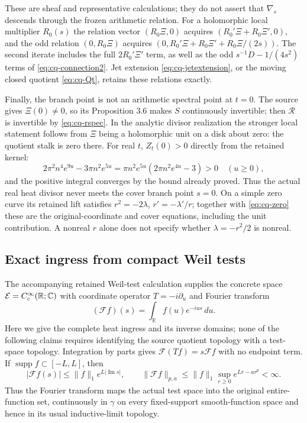 These are sheaf and representative calculations; they do not assert
that $\nabla_s$ descends through the frozen arithmetic relation.
For a holomorphic local multiplier $R_0(s)$ the relation vector
$(R_0\Xi,0)$ acquires $(R_0'\Xi+R_0\Xi',0)$, and the odd
relation $(0,R_0\Xi)$ acquires
$(0,R_0'\Xi+R_0\Xi'+R_0\Xi/(2s))$.
The second iterate includes the full $2R_0'\Xi'$ term, as well as
the odd $s^{-1}D-1/(4s^2)$ terms of
\eqref{eq:cq-connection2}. Jet extension
\eqref{eq:cq-jetextension}, or the moving closed quotient
\eqref{eq:cq-Qt}, retains these relations exactly.

Finally, the branch point is not an arithmetic spectral point at
$t=0$. The source gives $\Xi(0)\ne0$, so its Proposition 3.6
makes $S$ continuously invertible; then $\mathcal R$ is invertible
by \eqref{eq:cq-rspec}. In the analytic divisor realization the
stronger local statement follows from $\Xi$ being a holomorphic
unit on a disk about zero: the quotient stalk is zero there.
For real $t$, $Z_t(0)>0$ directly from the retained kernel:
\[
 2\pi^2n^4e^{9u}-3\pi n^2e^{5u}
 =\pi n^2e^{5u}(2\pi n^2e^{4u}-3)>0\quad(u\geq0),
\]
and the positive integral converges by the bound already proved.
Thus the actual real heat divisor never meets the cover branch
point $s=0$. On a simple zero curve its retained lift satisfies
$r^2=-2\lambda$, $r'=-\lambda'/r$; together with
\eqref{eq:cq-zero} these are the original-coordinate and cover
equations, including the unit contribution. A nonreal $r$ alone
does not specify whether $\lambda=-r^2/2$ is nonreal.

\subsection{Exact ingress from compact Weil tests}
\label{sec:cq-tests}
The accompanying retained Weil-test calculation supplies the concrete
space $\mathcal E=C_c^\infty(\mathbb R;\mathbb C)$ with coordinate
operator $T=-i\partial_u$ and Fourier transform
\[
 (\mathscr Ff)(s)=\int_{\mathbb R}f(u)e^{-ius}\,du.
\]
Here we give the complete heat ingress and its inverse domains;
none of the following claims requires identifying the source
quotient topology with a test-space topology. Integration by parts
gives $\mathscr F(Tf)=s\mathscr Ff$ with no endpoint term.
If $\operatorname{supp}f\subset[-L,L]$, then
\[
 |\mathscr Ff(s)|\leq\|f\|_1e^{L|\operatorname{Im}s|},
 \qquad
 \|\mathscr Ff\|_{p,a}\leq
 \|f\|_1\sup_{r\geq0}e^{Lr-ar^p}<\infty.
\]
Thus the Fourier transform maps the actual test space into the
original entire-function set, continuously in $\gamma$ on every
fixed-support smooth-function space and hence in its usual
inductive-limit topology.

